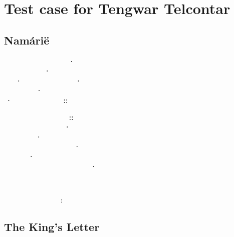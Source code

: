 \documentclass[11pt,a4paper]{article}
\begin{document}
\section*{Test case for Tengwar Telcontar}

\subsection*{Namárië}
\tengtelcq
{\rcap }     ⸱  \\
   ⸱     \\
⸱   ⸱  \\
 {\rcap } ⸱     \\
⸱  ⸬

      ⸬ \\
  {\rcap  } ⸱   \\
{\rcap } ⸱     \\
    ⸱ \\
  ⸱      \\
    {\rcap }  {\rcap ⸱}

{\rcap }   {\rcap }

   {\rcap } :

\subsection*{The King’s Letter}
\begin{center}
\tengtelcb
{\bcap  }  \\
   \\
  {\bcap } \\
     \\
    \\
     \\
    {\bcap } \\
       \\
    \\
  {\bul }  \\
  {\bcapul }  \\
  {\bul } ‍ 
\end{center}
\end{document}
